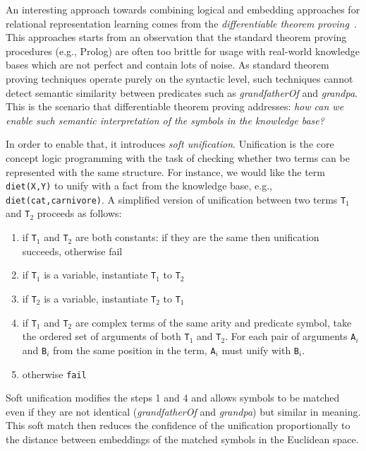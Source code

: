 An interesting approach towards combining logical and embedding approaches for relational representation learning comes from the \textit{differentiable theorem proving}~\cite{DTP2017}.
This approaches starts from an observation that the standard theorem proving procedures (e.g., Prolog) are often too brittle for usage with real-world knowledge bases which are not perfect and contain lots of noise.
As standard theorem proving techniques operate purely on the syntactic level, such techniques cannot detect semantic similarity between predicates such as \textit{grandfatherOf} and \textit{grandpa}.
This is the scenario that differentiable theorem proving addresses: \textit{how can we enable such semantic interpretation of the symbols in the knowledge base?}


In order to enable that, it introduces \textit{soft unification}.
Unification is the core concept logic programming with the task of checking whether two terms can be represented with the same structure.
For instance, we would like the term \texttt{diet(X,Y)} to unify with a fact from the knowledge base, e.g., \texttt{diet(cat,carnivore)}.
A simplified version of unification between two terms \texttt{T}$_1$ and \texttt{T}$_2$ proceeds as follows:
\begin{enumerate}
	\item if \texttt{T}$_1$ and \texttt{T}$_2$ are both constants: if they are the same then unification succeeds, otherwise fail
	\item if \texttt{T}$_1$ is a variable, instantiate \texttt{T}$_1$ to \texttt{T}$_2$
	\item if \texttt{T}$_2$ is a variable, instantiate \texttt{T}$_2$ to \texttt{T}$_1$
	\item if \texttt{T}$_1$ and \texttt{T}$_2$ are complex terms of the same arity and predicate symbol, take the ordered set of arguments of both \texttt{T}$_1$ and \texttt{T}$_2$. For each pair of arguments \texttt{A}$_i$ and \texttt{B}$_i$ from the same position in the term, \texttt{A}$_i$ must unify with \texttt{B}$_i$.
	\item otherwise \texttt{fail}
\end{enumerate}


Soft unification modifies the steps 1 and 4 and allows symbols to be matched even if they are not identical (\textit{grandfatherOf} and \textit{grandpa}) but similar in meaning. %
This soft match then reduces the confidence of the unification proportionally to the distance between embeddings of the matched symbols in the Euclidean space.












\cleardoublepage

